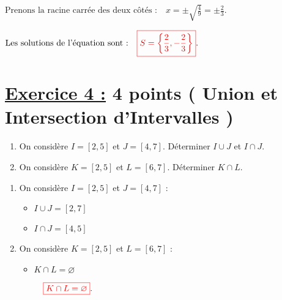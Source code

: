 \documentclass[12pt,a4paper]{article}
\begin{document}
\(
\text{Prenons la racine carrée des deux côtés :} \quad x = \pm \sqrt{\frac{4}{9}} = \pm \frac{2}{3}.
\)

\(
\text{Les solutions de l'équation sont :} \quad
\textcolor{red}{\boxed{S=\left\lbrace  \frac{2}{3},-\frac{2}{3} \right\rbrace }}.
\)


\section*{\underline{Exercice 4 :} 4 points ( Union et Intersection d'Intervalles )}  

\begin{enumerate}  
\item On considère \( I = [2, 5] \) et \( J = [4, 7] \). Déterminer \( I \cup J \) et \( I \cap J \).  

\item On considère \( K = [2, 5] \) et \( L = [6, 7] \). Déterminer \( K \cap L \).  
\end{enumerate}

\begin{enumerate}
    \item On considère $I = [2, 5]$ et $J = [4, 7]$ :
    \begin{itemize}
        \item $I \cup J = [2, 7]$
        \item $I \cap J = [4, 5]$
    \end{itemize}

    \item On considère $K = [2, 5]$ et $L = [6, 7]$ :
    \begin{itemize}
        \item $K \cap L = \varnothing$
        
 \(
 \quad
\textcolor{red}{\boxed{K \cap L = \varnothing  }}.
\)
    \end{itemize}
\end{enumerate}
\end{document}
